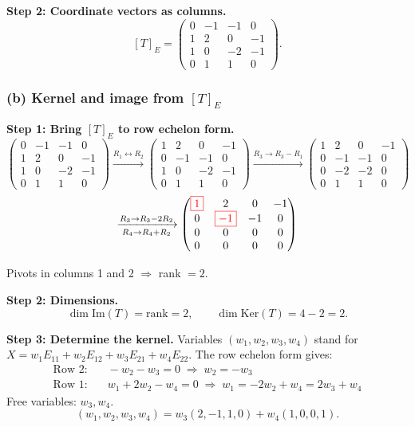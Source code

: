 \documentclass[a4paper,12pt]{article}
\newcommand{\piv}[1]{{\color{red}\boxed{#1}}}
\begin{document}
\textbf{Step 2: Coordinate vectors as columns.}
\[
[T]_E = \begin{pmatrix}
0 & -1 & -1 & 0 \\
1 & 2 & 0 & -1 \\
1 & 0 & -2 & -1 \\
0 & 1 & 1 & 0
\end{pmatrix}.
\]

\subsubsection*{(b) Kernel and image from $[T]_E$}

\textbf{Step 1: Bring $[T]_E$ to row echelon form.}
\[
\begin{pmatrix}
0 & -1 & -1 & 0 \\
1 & 2 & 0 & -1 \\
1 & 0 & -2 & -1 \\
0 & 1 & 1 & 0
\end{pmatrix}
\xrightarrow{R_1 \leftrightarrow R_2}
\begin{pmatrix}
1 & 2 & 0 & -1 \\
0 & -1 & -1 & 0 \\
1 & 0 & -2 & -1 \\
0 & 1 & 1 & 0
\end{pmatrix}
\xrightarrow{R_3 \to R_3 - R_1}
\begin{pmatrix}
1 & 2 & 0 & -1 \\
0 & -1 & -1 & 0 \\
0 & -2 & -2 & 0 \\
0 & 1 & 1 & 0
\end{pmatrix}
\]
\[
\xrightarrow[R_4 \to R_4 + R_2]{R_3 \to R_3 - 2R_2}
\begin{pmatrix}
\piv{1} & 2 & 0 & -1 \\
0 & \piv{-1} & -1 & 0 \\
0 & 0 & 0 & 0 \\
0 & 0 & 0 & 0
\end{pmatrix}
\]

Pivots in columns 1 and 2 $\Rightarrow$ rank $= 2$.

\textbf{Step 2: Dimensions.}
\[
\dim \text{Im}(T) = \text{rank} = 2, \qquad \dim \text{Ker}(T) = 4 - 2 = 2.
\]

\textbf{Step 3: Determine the kernel.} Variables $(w_1, w_2, w_3, w_4)$ stand for $X = w_1 E_{11} + w_2 E_{12} + w_3 E_{21} + w_4 E_{22}$. The row echelon form gives:
\begin{align*}
\text{Row 2:} &\quad -w_2 - w_3 = 0 \;\Rightarrow\; w_2 = -w_3 \\
\text{Row 1:} &\quad w_1 + 2w_2 - w_4 = 0 \;\Rightarrow\; w_1 = -2w_2 + w_4 = 2w_3 + w_4
\end{align*}
Free variables: $w_3, w_4$.
\[
(w_1, w_2, w_3, w_4) = w_3(2, -1, 1, 0) + w_4(1, 0, 0, 1).
\]
\end{document}
